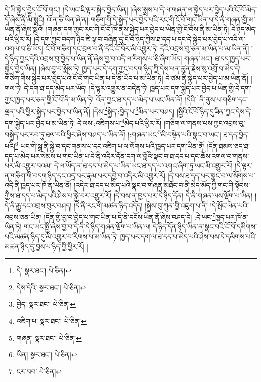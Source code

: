 དེ་ཡི་སྐྱེད་བྱེད་ངོ་བོ་གང་། །དེ་ཡང་ཇི་ལྟར་སྐྱེད་བྱེད་ཡིན། །ཞེས་སྨྲས་པ་དེ་ལ་གཞན་ལ་སྐྱེད་པར་བྱེད་པའི་ངོ་བོ་མེད་དོ་ཞེས་ནི་མི་སྨྲའི། འོ་ན་ཅི་ཡིན་ཞེ་ན། གཅིག་གི་དེ་སྐྱེད་པར་བྱེད་པའི་རང་གི་ངོ་བོ་གང་ཡིན་པ་དེ་ནི་གཞན་གྱི་མ་ཡིན་ནོ་ཞེས་སྨྲའོ། །གཞན་དག་ཀྱང་རང་གི་ངོ་བོ་ཁོ་ནས་སྐྱེད་པར་བྱེད་པ་ཡིན་གྱི་ངོ་བོས་ནི་མ་ཡིན་ཏེ། དེ་ཉིད་མེད་པའི་ཕྱིར་རོ། །དེ་དག་ཀྱང་བདག་ཉིད་ཇི་ལྟ་བ་བཞིན་དུ་ངོ་བོ་ཉིད་ཀྱིས་ཐ་དད་པ་དང་དེ་སྐྱེད་པར་བྱེད་པ་འདི་ལ་འགལ་བ་ཅི་ཡོད། ངོ་བོ་གཅིག་དང་བྲལ་བ་ནི་དེའི་ངོ་བོར་མི་འགྱུར་ཏེ། དེའི་འབྲས་བུ་ཅན་མ་ཡིན་པ་མ་ཡིན་ནོ། །དེ་ཉིད་ཀྱང་དེའི་འབྲས་བུ་བྱེད་པ་ཡིན་ནོ་ཞེས་བྱ་བ་འདི་ལ་རིགས་པ་ཅི་ཞིག་ཡོད། གཞན་ཡང་། ཐ་དད་ཁྱད་པར་སྐྱེད་བྱེད་ཡིན། །ཞེས་བྱ་བ་སྨོས་ཏེ། ཁྱད་པར་དེ་དག་ཀྱང་བདག་ཉིད་ཀྱི་དེས་ཕན་ཚུན་རྗེས་སུ་འགྲོ་བ་མེད་དེ། གཅིག་གིས་སྐྱེད་པར་བྱེད་པའི་ངོ་བོ་གང་ཡིན་པ་དེ་ནི་ཡོད་པ་མ་ཡིན་ཏེ། དེ་ཙམ་ནི་སྐྱེད་པར་བྱེད་པ་མ་ཡིན་ནོ། །གལ་ཏེ། དེ་དག་ཐ་དད་མེད་པར་ཡོད། །དེ་ལྟར་འགྱུར་ན་བདེན་ཏེ། ཁྱད་པར་དག་སྐྱེད་པར་བྱེད་པ་ཡིན་གྱི་དེ་དག་ཀྱང་ཁྱད་པར་ཅན་གྱི་ངོ་བོ་ནི་མ་ཡིན་ཏེ། འོན་ཀྱང་ཐ་དད་པ་མེད་པ་ཡང་ཡིན་ནོ། །དེའི་\footnote{དེ་  སྣར་ཐང་།  པེ་ཅིན། }ནི་ནུས་པ་གཅིག་དང་ལྡན་པའི་ཕྱིར་སྐྱེད་པར་བྱེད་པ་ཡིན་ནོ། །དེས་\footnote{དེས་དེའི་  སྣར་ཐང་།  པེ་ཅིན། }སྐྱེད་:བྱེད་པ་\footnote{བྱེད་  སྣར་ཐང་།  པེ་ཅིན། }མིན་པར་བཤད། །སྤྱིའི་ངོ་བོ་ཉིད་དུ་ཟིན་ཀྱང་དེས་དེ་དག་སྐྱེད་པར་བྱེད་པ་མ་ཡིན་ཏེ། དེ་ལས་:འཇིགས་པ་\footnote{འཇིག་པ་  སྣར་ཐང་།  པེ་ཅིན། }མེད་པའི་ཕྱིར་རོ། །གཅིག་ལ་གནས་པས་ཀྱང་འབྲས་བུ་བསྐྱེད་པར་རབ་ཏུ་ཐལ་བའི་ཕྱིར་ཞེས་བཤད་པ་ཡིན་ནོ། །:གཞན་ཡང་\footnote{གཞན་  སྣར་ཐང་།  པེ་ཅིན། }མི་བསྟེན་པའི་སྣང་བ་ཡང་། ཐ་དད་བྱེད་པའི།\footnote{ཡིན།  སྣར་ཐང་།  པེ་ཅིན། } ཡང་གི་སྒྲ་ནི་སྐྱེ་བ་དང་གནས་པ་དང་འཇིག་པ་ལ་སོགས་པའི་ཁྱད་པར་དག་ཡིན་ནོ། །དོན་ཐམས་ཅད་ཐ་དད་པ་མེད་པར་སེམས་པ་གང་ཡིན་པ་དེ་ནི་འདིར་དོན་དག་ལ་བློའི་སྣང་བ་ཐ་དད་པ་དང་ཆོས་འགལ་བ་གནས་པར་མི་འགྱུར་བའམ། དེ་ལ་ཡོད་ན་ཐ་དད་པ་མེད་པ་ཡིན་ཡང་ཐ་དད་པ་འགའ་ཞིག་ཏུ་ཡང་མི་འགྱུར་རོ། །དེ་ལྟར་ན་གཅིག་གི་བདག་ཉིད་དང་འདྲ་བར་རྣམ་པར་དབྱེ་བ་འདིར་མི་འགྱུར་རོ། །དེ་བས་ཐ་དད་པར་སྣང་བ་ལ་སོགས་པ་འདི་ནི་ཁྱད་པར་ཁོ་ན་ཡིན་ནོ། །འདིར་ཐ་དད་པ་མེད་པའི་སྣང་བ་གཞན་མཐོང་བ་ནི་མེད་མོད་ཀྱི་གང་གི་སྟོབས་ཀྱིས་ཐ་དད་པ་མེད་པའི་ཤེས་པ་སྐྱེ་བར་འགྱུར་རོ། །དེ་བས་ན་ཁྱད་པར་དེ་ཉིད་དོན། དེ་ནི་གཞན་ལས་ལྡོག་པ་ཡིན། །དེ་ནི་རྒྱུ་དང་འབྲས་བུར་བཤད། །དེ་ནི་རང་གི་མཚན་ཉིད་འདོད། །སྐྱེས་བུ་ཀུན་གྱི་འཇུག་པ་ནི། །དེ་སྤོང་ལེན་པའི་འབྲས་ཅན་ཡིན། །དོན་གྱི་བྱ་བ་བྱེད་པ་གང་ཡིན་པ་དེ་ནི་དངོས་ཡིན་ནོ་ཞེས་བཤད་དེ། :དེ་ཡང་\footnote{ངར་བབ་  པེ་ཅིན། }ཁྱད་པར་ཁོ་ན་ཡིན་ཏེ། གང་ཡང་སྤྱི་ཞེས་བྱ་བ་དེ་ནི་དེ་ཉིད་གཞན་ལྡོག་པ་ཡིན་ལ། དེ་ཉིད་དོན་ཉིད་ཡིན་ན་སྣང་བའི་ངོ་བོ་དམིགས་པའི་མཚན་ཉིད་དུ་མི་འགྱུར་བ་རིགས་པ་མ་ཡིན་ཏེ། ཁྱད་པར་དག་ལ་ཐ་དད་པ་མེད་པའི་ཤེས་པས་དེ་དམིགས་པའི་མཚན་ཉིད་དུ་བྱས་པ་ཉིད་ཀྱི་ཕྱིར་རོ། །
